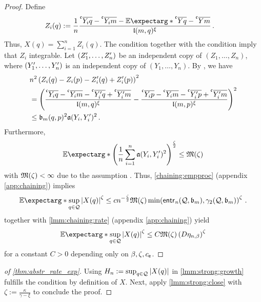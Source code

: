 \begin{proof}
	Define
	\begin{align*}
		Z_i(q) 
		&:= 
		\frac1n \frac{\olc{Y_i}q-\olc{Y_i}m-\Ex*{\olc Yq-\olc Ym}}{\mf l(m, q)^\xi}
		\eqfs
	\end{align*}
	Thus, $X(q) = \sum_{i=1}^n Z_i(q)$.
	The  condition together with the  condition imply that $Z_i$ integrable.
	Let $(Z_1^\prime, \dots, Z_n^\prime)$ be an independent copy of $(Z_1, \dots, Z_n)$, where $(Y_1^\prime, \dots, Y_n^\prime)$ is an independent copy of $(Y_1, \dots, Y_n)$.
	By , we have
	\begin{align*}
			&
		n^2 \br{Z_i(q)-Z_i(p)-Z_i\pr(q)+Z_i\pr(p)}^2 
		\\&= 
		\br{\frac{\olc{Y_i}q-\olc{Y_i}m-\olc{Y_i\pr}q+\olc{Y_i\pr}m}{\mf l(m,q)^\xi}-\frac{\olc{Y_i}p-\olc{Y_i}m-\olc{Y_i\pr}p+\olc{Y_i\pr}m}{\mf l(m,p)^\xi}}^2
		\\&\leq 
		\mf b_m(q,p)^2 \mf a(Y_i,Y_i\pr)^2
		\eqfs
	\end{align*}
	Furthermore,
	\begin{equation*}
		\Ex*{\br{\frac1n\sum_{i=1}^n \mf a(Y_i, Y_i\pr)^2}^{\frac\zeta2}} \leq \mf M(\zeta)
	\end{equation*}
	with $\mathfrak{M}(\zeta) < \infty$ due to the assumption .
	Thus, \autoref{chaining:empproc} (appendix \autoref{app:chaining}) implies
	\begin{equation*}
		\Ex*{\sup_{q\in\mc Q} \abs{X(q)}^\zeta} \leq c n^{-\frac\zeta2} \mf M(\zeta) \min\brOf{\entrn(\mc Q, \mf b_m), \gamma_2(\mc Q, \mf b_m)}^\zeta \eqfs
	\end{equation*}
	 together with \autoref{lmm:chaining:rate} (appendix \autoref{app:chaining}) yield
	\begin{equation*}
		\Ex*{\sup_{q\in\mc Q} \abs{X(q)}^\zeta} \leq C \mf M(\zeta) \br{D \eta_{n,\beta}}^\zeta
\end{equation*}
	for a constant $C > 0$ depending only on $\beta, \zeta, c_{\mathsf{e}}$.
\end{proof}
%
\begin{proof}[of \autoref{thm:abstr_rate_exp}]
	Using $H_n := \sup_{q\in\mathcal{Q}} \left| X(q) \right|$ in \autoref{lmm:strong:growth} fulfills the  condition by definition of $X$. Next, apply  \autoref{lmm:strong:close} with $\zeta := \frac{\kappa}{\gamma-\xi}$ to conclude the proof.
\end{proof}
%
%
%
